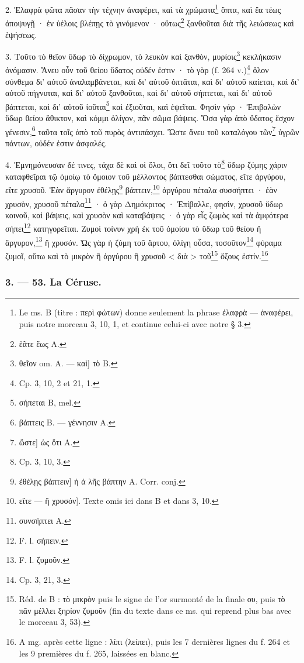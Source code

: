 \documentclass[landscape, a4paper, 11pt, oneside, polutonikogreek, french]{article}
\begin{document}
2. Ἐλαφρὰ φῶτα πᾶσαν τὴν τέχνην ἀναφέρει, καὶ τὰ χρώματα\footnote{Le ms. B (titre : περὶ φώτων) donne seulement la phrase ἐλαφρὰ --- ἀναφέρει, puis notre morceau 3, 10, 1, et continue celui-ci avec notre § 3.} ὄπτα, καὶ ἔα τέως ἀποψυγῇ · ἐν ὑέλοις βλέπῃς τὸ γινόμενον · οὕτως\footnote{ἑᾶτε ἕως A.} ξανθοῦται διὰ τῆς λειώσεως καὶ ἑψήσεως.

3. Τοῦτο τὸ θεῖον ὕδωρ τὸ δίχρωμον, τὸ λευκὸν καὶ ξανθὸν, μυρίοις\footnote{θεῖον om. A. --- καὶ] τὸ B.} κεκλήκασιν ὀνόμασιν. Ἄνευ οὖν τοῦ θείου ὕδατος οὐδέν ἐστιν · τὸ γὰρ (f. 264 v.)\footnote{Cp. 3, 10, 2 et 21, 1.} ὅλον σύνθεμα δι' αὐτοῦ ἀναλαμβάνεται, καὶ δι' αὐτοῦ ὀπτᾶται, καὶ δι' αὐτοῦ καίεται, καὶ δι' αὐτοῦ πήγνυται, καὶ δι' αὐτοῦ ξανθοῦται, καὶ δι' αὐτοῦ σήπτεται, καὶ δι' αὐτοῦ βάπτεται, καὶ δι' αὐτοῦ ἰοῦται\footnote{σήπεται B, mel.} καὶ ἐξιοῦται, καὶ ἑψεῖται. Φησὶν γάρ · Ἐπιβαλὼν ὕδωρ θείου ἄθικτον, καὶ κόμμι ὀλίγον, πᾶν σῶμα βάψεις. Ὅσα γὰρ ἀπὸ ὕδατος ἔσχον γένεσιν,\footnote{βάπτεις B. --- γέννησιν A.} ταῦτα τοῖς ἀπὸ τοῦ πυρὸς ἀντιπάσχει. Ὥστε ἄνευ τοῦ καταλόγου τῶν\footnote{ὥστε] ὡς ὅτι A.} ὑγρῶν πάντων, οὐδέν ἐστιν ἀσφαλές.

4. Ἐμνημόνευσαν δέ τινες, τάχα δὲ καὶ οἱ ὅλοι, ὅτι δεῖ τοῦτο τὸ\footnote{Cp. 3, 10, 3.} ὕδωρ ζύμης χάριν καταφθεῖραι τῷ ὁμοίῳ τὸ ὅμοιον τοῦ μέλλοντος βάπτεσθαι σώματος, εἴτε ἀργύρου, εἴτε χρυσοῦ. Ἐὰν ἄργυρον ἐθέλῃς\footnote{ἐθέλῃς βάπτειν] ἡ ἀ λῆς βάπτην A. Corr. conj.} βάπτειν,\footnote{εἴτε --- ἢ χρυσόν]. Texte omis ici dans B et dans 3, 10.} ἀργύρου πέταλα συσσήπτει · ἐὰν χρυσὸν, χρυσοῦ πέταλα\footnote{συνσήπτει A.} · ὁ γὰρ Δημόκριτος · Ἐπίβαλλε, φησὶν, χρυσοῦ ὕδωρ κοινοῦ, καὶ βάψεις, καὶ χρυσὸν καὶ καταβάψεις · ὁ γὰρ εἷς ζωμὸς καὶ τὰ ἀμφότερα σήπει\footnote{F. l. σήπειν.} κατηγορεῖται. Ζυμοὶ τοίνυν χρὴ ἐκ τοῦ ὁμοίου τὸ ὕδωρ τοῦ θείου ἢ ἄργυρον,\footnote{F. l. ζυμοῦν.} ἢ χρυσόν. Ὡς γὰρ ἡ ζύμη τοῦ ἄρτου, ὀλίγη οὖσα, τοσοῦτον\footnote{Cp. 3, 21, 3.} φύραμα ζυμοῖ, οὕτω καὶ τὸ μικρὸν ἢ ἀργύρου ἢ χρυσοῦ < διὰ > τοῦ\footnote{Réd. de B : τὸ μικρὸν puis le signe de l'or surmonté de la finale ου, puis τὸ πᾶν μέλλει ξηρίον ζυμοῦν (fin du texte dans ce ms. qui reprend plus bas avec le morceau 3, 53).} ὄξους ἐστίν.\footnote{A mg. après cette ligne : λίπι (λείπει), puis les 7 dernières lignes du f. 264 et les 9 premières du f. 265, laissées en blanc.}

\bigskip
\centerline{\EightStarTaper}
\centerline{\EightStarTaper\EightStarTaper}
\bigskip

\subsubsection{3. --- 53. La Céruse.}
\end{document}
